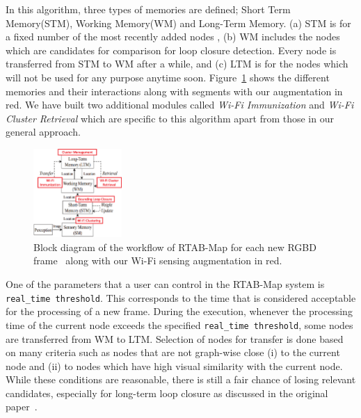 In this algorithm, three types of memories are defined; Short Term Memory(STM), Working Memory(WM) and Long-Term Memory.
(a) STM is for a fixed number of the most recently added nodes %
, (b) WM includes the nodes which are candidates for comparison for loop closure detection. Every node is transferred from STM to WM after a while, and 
 (c) LTM is for the nodes which will not be used for any purpose anytime soon. 
 Figure~\ref{fig:RTABMAP_flowchart} shows the different memories and their interactions along with segments with our augmentation in red. We have built two additional modules called {\it Wi-Fi Immunization} and {\it Wi-Fi Cluster Retrieval} which are specific to this algorithm apart from those in our general approach. 
\begin{figure}
\centering
\includegraphics[width=0.3\textwidth]{Figure4.eps}
    \caption{Block diagram of the workflow of RTAB-Map for each new RGBD frame~\cite{rtabmap} along with our Wi-Fi sensing augmentation in red.}
\label{fig:RTABMAP_flowchart}
\vspace{-20pt}
\end{figure}

One of the parameters that a user can control in the RTAB-Map system is {\tt real\_time threshold}. This corresponds to the time that is considered acceptable for the processing of a new frame. During the execution, whenever the processing time of the current node exceeds the specified {\tt real\_time threshold}, some nodes are transferred from WM to LTM. Selection of nodes for transfer is done based on many criteria such as nodes that are not graph-wise close (i) to the current node and (ii) to nodes which have high visual similarity with the current node. While these conditions are reasonable, there is still a fair chance of losing relevant candidates, especially for long-term loop closure as discussed in the original paper~\cite{rtabmap}.
